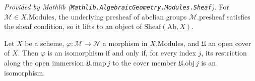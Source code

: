 \begin{lemma}
  \label{lem:modules_isSheaf_mathlib}
  \mathlibok
  \textit{Provided by Mathlib
  (\texttt{Mathlib.AlgebraicGeometry.Modules.Sheaf}).}
  For \(\mathcal{M} \in X.\mathrm{Modules}\), the underlying presheaf of abelian groups
  \(\mathcal{M}.\mathrm{presheaf}\) satisfies the sheaf condition, so it lifts to an object of
  \(\mathrm{Sheaf}(\mathrm{Ab}, X)\).
\end{lemma}

\begin{lemma}\leanok
  \label{lem:isIso_iff_isIso_restrict}
  Let \(X\) be a scheme, \(\varphi : \mathcal{M} \to \mathcal{N}\) a morphism in
  \(X.\mathrm{Modules}\), and \(\mathfrak{U}\) an open cover of \(X\). Then \(\varphi\) is an
  isomorphism if and only if, for every index \(j\), its restriction along the open immersion
  \(\mathfrak{U}.\mathrm{map}\,j\) to the cover member \(\mathfrak{U}.\mathrm{obj}\,j\) is
  an isomorphism.
\end{lemma}
